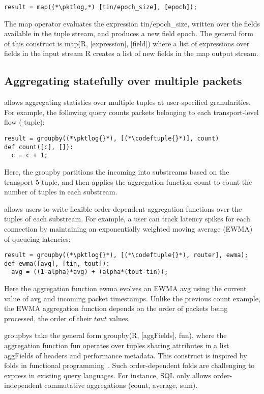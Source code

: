 \begin{lstlisting}
result = map((*\pktlog,*) [tin/epoch_size], [epoch]);
\end{lstlisting}

The {\ct map} operator evaluates the expression {\ct tin/epoch\_size}, written
over the fields available in the tuple stream, and produces a new field {\ct
epoch}. The general form of this construct is {\ct map(R, [expression],
[field])} where a list of {\ct expression}s over fields in the input stream
{\ct R} creates a list of new {\ct field}s in the {\ct map} output stream.

\subsection{Aggregating statefully over multiple packets} \TheSystem allows
aggregating statistics over multiple tuples at user-specified granularities.
For example, the following query counts packets belonging to each
transport-level flow (-tuple):

\begin{lstlisting}
result = groupby((*\pktlog{}*), [(*\codeftuple{}*)], count)
def count([c], []):
  c = c + 1;
\end{lstlisting}

Here, the {\ct groupby} partitions the incoming {\ct \pktlog} into substreams
based on the transport 5-tuple, and then applies the aggregation function {\ct
count} to count the number of tuples in each substream.

\TheSystem allows users to write flexible order-dependent aggregation functions
over the tuples of each substream. For example, a user can track latency spikes
for each connection by maintaining an exponentially weighted moving average
(EWMA) of queueing latencies:

\begin{lstlisting}
result = groupby((*\pktlog{}*), [(*\codeftuple{}*), router], ewma);
def ewma([avg], [tin, tout]):
  avg = ((1-alpha)*avg) + (alpha*(tout-tin));
\end{lstlisting}

Here the aggregation function {\ct ewma} evolves an EWMA {\ct avg} using the
current value of {\ct avg} and incoming packet timestamps. Unlike the previous
{\ct count} example, the EWMA aggregation function depends on the order of
packets being processed, \ie the order of their $tout$ values.

{\ct groupby}s take the general form {\ct groupby(R, [aggFields], fun)}, where
the aggregation function {\ct fun} operates over tuples sharing attributes in a
list {\ct aggFields} of headers and performance metadata. This construct is
inspired by folds in functional
programming~\cite{comprehensive-comprehensions}.  Such order-dependent folds
are challenging to express in existing query languages. For instance, SQL only
allows order-independent commutative aggregations (\eg count, average, sum).

